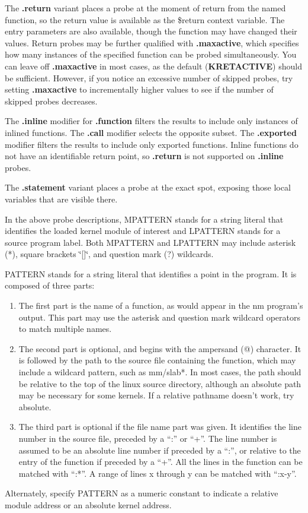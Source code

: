 \documentclass[twoside,english]{article}
\begin{document}
The \textbf{.return} variant places a probe at the moment of return from the named
function, so the return value is available as the \$return context variable.
The entry parameters are also available, though the function may have changed
their values.  Return probes may be further qualified with \textbf{.maxactive},
which specifies how many instances of the specified function can be probed simultaneously.
You can leave off \textbf{.maxactive} in most cases, as the default
(\textbf{KRETACTIVE}) should be sufficient.
However, if you notice an excessive number of skipped probes, try setting \textbf{.maxactive}
to incrementally higher values to see if the number of skipped probes decreases.

The \textbf{.inline} modifier for \textbf{.function} filters the results to include only
instances of inlined functions. The \textbf{.call} modifier selects the opposite subset.  
The \textbf{.exported} modifier filters the results to include only exported functions.
Inline functions do not have an identifiable return point, so \textbf{.return}
is not supported on \textbf{.inline} probes.

The \textbf{.statement} variant places a probe at the exact spot, exposing those local
variables that are visible there.

In the above probe descriptions, MPATTERN stands for a string literal
that identifies the loaded kernel module of interest and LPATTERN
stands for a source program label. Both MPATTERN and LPATTERN may
include asterisk ({*}), square brackets \char`\"{}{[}]\char`\"{}, and
question mark (?) wildcards.

PATTERN stands for a string literal that identifies a point in the program.
It is composed of three parts:

\begin{enumerate}
\item The first part is the name of a function, as would appear in the nm program's
output. This part may use the asterisk and question mark wildcard operators
to match multiple names.
\item The second part is optional, and begins with the ampersand (@) character.
It is followed by the path to the source file containing the function,
which may include a wildcard pattern, such as mm/slab{*}.
In most cases, the path should be relative to the top of the
linux source directory, although an absolute path may be necessary for some kernels.
If a relative pathname doesn't work, try absolute.
\item The third part is optional if the file name part was given. It identifies
the line number in the source file, preceded by a ``:'' or ``+''.
The line number is assumed to be an
absolute line number if preceded by a ``:'', or relative to the entry of
the function if preceded by a ``+''.
All the lines in the function can be matched with ``:*''.
A range of lines x through y can be matched with ``:x-y''.

\end{enumerate}
Alternately, specify PATTERN as a numeric constant to indicate a relative
module address or an absolute kernel address.
\end{document}

